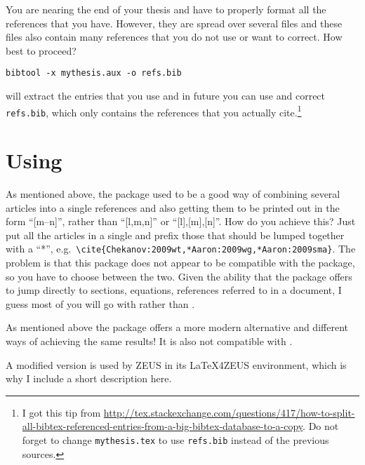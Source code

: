 You are nearing the end of your thesis and have to properly format all
the references that you have. However, they are spread over several
files and these files also contain many references that you do not use
or want to correct. How best to proceed?
\begin{verbatim}
bibtool -x mythesis.aux -o refs.bib
\end{verbatim}
will extract the entries that you use and in future you can use and
correct \texttt{refs.bib}, which only contains the references that you
actually cite.\footnote{%
I got this tip from
\url{http://tex.stackexchange.com/questions/417/how-to-split-all-bibtex-referenced-entries-from-a-big-bibtex-database-to-a-copy}. Do
not forget to change \texttt{mythesis.tex} to use
\texttt{refs.bib} instead of the previous sources.}


\section{Using }
\label{sec:ref:mcite}

As mentioned above, the  package used to be a good way
of combining several articles into a single references and also
getting them to be printed out in the form \enquote{[m--n]}, rather
than \enquote{[l,m,n]} or \enquote{[l],[m],[n]}. How do you achieve
this?  Just put all the articles in a single  and prefix
those that should be lumped together with a \enquote{*}, e.g.\
\verb+\cite{Chekanov:2009wt,*Aaron:2009wg,*Aaron:2009sma}+.  The
problem is that this package does not appear to be compatible with the
 package, so you have to choose between the
two. Given the ability that the \Package{hyperref} package offers to
jump directly to sections, equations, references referred to in a
document, I guess most of you will go with \Package{hyperref} rather
than \Package{mcite}.

As mentioned above the  package offers a
more modern alternative and different ways of achieving the same
results! It is also not compatible with .

A modified version \Package{mcite} is used by ZEUS in its LaTeX4ZEUS
environment, which is why I include a short description here.

